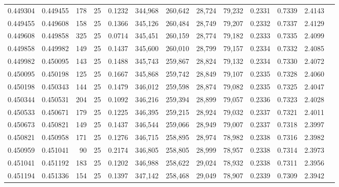 \begin{tabular}{rrrrrrrrrrrrr}
0.449304 & 0.449455 &   178 &  25 &                                     0.1232 & 344,968 & 260,642 &  28,724 &  79,232 & 0.2331 & 0.7339 & 2.4143 \\
0.449455 & 0.449608 &   158 &  25 &                                     0.1366 & 345,126 & 260,484 &  28,749 &  79,207 & 0.2332 & 0.7337 & 2.4129 \\
0.449608 & 0.449858 &   325 &  25 &                                     0.0714 & 345,451 & 260,159 &  28,774 &  79,182 & 0.2333 & 0.7335 & 2.4099 \\
0.449858 & 0.449982 &   149 &  25 &                                     0.1437 & 345,600 & 260,010 &  28,799 &  79,157 & 0.2334 & 0.7332 & 2.4085 \\
0.449982 & 0.450095 &   143 &  25 &                                     0.1488 & 345,743 & 259,867 &  28,824 &  79,132 & 0.2334 & 0.7330 & 2.4072 \\
0.450095 & 0.450198 &   125 &  25 &                                     0.1667 & 345,868 & 259,742 &  28,849 &  79,107 & 0.2335 & 0.7328 & 2.4060 \\
0.450198 & 0.450343 &   144 &  25 &                                     0.1479 & 346,012 & 259,598 &  28,874 &  79,082 & 0.2335 & 0.7325 & 2.4047 \\
0.450344 & 0.450531 &   204 &  25 &                                     0.1092 & 346,216 & 259,394 &  28,899 &  79,057 & 0.2336 & 0.7323 & 2.4028 \\
0.450533 & 0.450671 &   179 &  25 &                                     0.1225 & 346,395 & 259,215 &  28,924 &  79,032 & 0.2337 & 0.7321 & 2.4011 \\
0.450673 & 0.450821 &   149 &  25 &                                     0.1437 & 346,544 & 259,066 &  28,949 &  79,007 & 0.2337 & 0.7318 & 2.3997 \\
0.450821 & 0.450958 &   171 &  25 &                                     0.1276 & 346,715 & 258,895 &  28,974 &  78,982 & 0.2338 & 0.7316 & 2.3982 \\
0.450959 & 0.451041 &    90 &  25 &                                     0.2174 & 346,805 & 258,805 &  28,999 &  78,957 & 0.2338 & 0.7314 & 2.3973 \\
0.451041 & 0.451192 &   183 &  25 &                                     0.1202 & 346,988 & 258,622 &  29,024 &  78,932 & 0.2338 & 0.7311 & 2.3956 \\
0.451194 & 0.451336 &   154 &  25 &                                     0.1397 & 347,142 & 258,468 &  29,049 &  78,907 & 0.2339 & 0.7309 & 2.3942 \\

\end{tabular}
